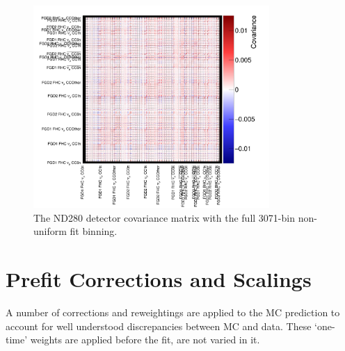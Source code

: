 \begin{figure}[h]
\centering
\includegraphics*[width=0.8\textwidth,clip]{figs/detcovFit}
\caption{The ND280 detector covariance matrix with the full 3071-bin non-uniform fit binning.}\label{fig:detcorrFit}
\end{figure}

\section{Prefit Corrections and Scalings}\label{sec:corr}

A number of corrections and reweightings are applied to the MC prediction to account for well understood discrepancies between MC and data. These `one-time' weights are applied before the fit, are not varied in it. 

